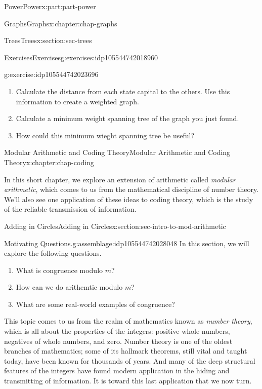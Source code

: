 \documentclass[oneside,10pt,]{book}
\numberwithin{equation}{section}
\begin{document}
\begin{partptx}{Power}{}{Power}{}{}{x:part:part-power}
\begin{chapterptx}{Graphs}{}{Graphs}{}{}{x:chapter:chap-graphs}
\begin{sectionptx}{Trees}{}{Trees}{}{}{x:section:sec-trees}
\begin{exercises-subsection-numberless}{Exercises}{}{Exercises}{}{}{g:exercises:idp105544742018960}
\begin{divisionexercise}{5}{}{}{g:exercise:idp105544742023696}
%
\begin{enumerate}[label=(\alph*)]
\item{}Calculate the distance from each state capital to the others. Use this information to create a weighted graph.%
\item{}Calculate a minimum weight spanning tree of the graph you just found.%
\item{}How could this minimum wieght spanning tree be useful?%
\end{enumerate}
\end{divisionexercise}%
\end{exercises-subsection-numberless}
\end{sectionptx}
\end{chapterptx}
%
\typeout{************************************************}
\typeout{************************************************}
%
\begin{chapterptx}{Modular Arithmetic and Coding Theory}{}{Modular Arithmetic and Coding Theory}{}{}{x:chapter:chap-coding}
\begin{introduction}{}%
In this short chapter, we explore an extension of arithmetic called \emph{modular arithmetic}, which comes to us from the mathematical discipline of number theory. We'll also see one application of these ideas to coding theory, which is the study of the reliable transmission of information.%
\end{introduction}%
%
%
\typeout{************************************************}
\typeout{************************************************}
%
\begin{sectionptx}{Adding in Circles}{}{Adding in Circles}{}{}{x:section:sec-intro-to-mod-arithmetic}
\begin{assemblage}{Motivating Questions.}{g:assemblage:idp105544742028048}%
In this section, we will explore the following questions. %
\begin{enumerate}
\item{}What is congruence modulo \(m\)?%
\item{}How can we do arithemtic modulo \(m\)?%
\item{}What are some real-world examples of congruence?%
\end{enumerate}
%
\end{assemblage}
This topic comes to us from the realm of mathematics known as \emph{number theory}, which is all about the properties of the integers: positive whole numbers, negatives of whole numbers, and zero. Number theory is one of the oldest branches of mathematics; some of its hallmark theorems, still vital and taught today, have been known for thousands of years. And many of the deep structural features of the integers have found modern application in the hiding and transmitting of information. It is toward this last application that we now turn.%

\end{sectionptx}
\end{chapterptx}
\end{partptx}
\end{document}

